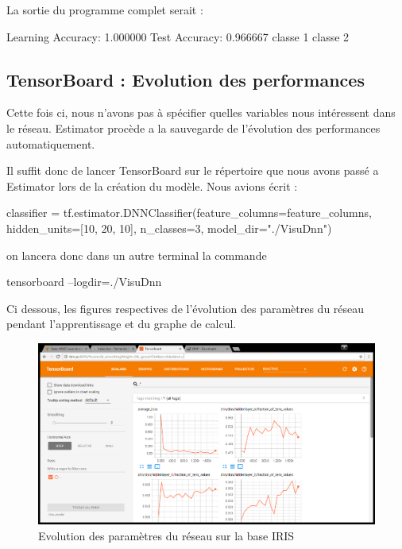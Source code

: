 \documentclass[a4paper,11pt]{book}
\begin{document}
La sortie du programme complet serait :
\begin{myoutput}
Learning Accuracy: 1.000000
Test Accuracy: 0.966667
classe  1
classe  2
\end{myoutput}

\subsection{TensorBoard : Evolution des performances}
Cette fois ci, nous n'avons pas à spécifier quelles variables nous intéressent dans le réseau. Estimator procède a la sauvegarde de l'évolution des performances automatiquement.

Il suffit donc de lancer TensorBoard sur le répertoire que nous avons passé a Estimator lors de la création du modèle.
Nous avions écrit :
\begin{mypython}
classifier = tf.estimator.DNNClassifier(feature_columns=feature_columns,
                                      hidden_units=[10, 20, 10],
                                      n_classes=3,
                                      model_dir="./VisuDnn")
\end{mypython}
on lancera donc dans un autre terminal la commande 
\begin{mybash}
tensorboard --logdir=./VisuDnn
\end{mybash}

Ci dessous, les figures respectives de l'évolution des paramètres du réseau pendant l'apprentissage et du graphe de calcul.
\begin{figure}[H]

\begin{center}
\includegraphics[width=16cm]{./figures/TensorBoardIrisDnn.png} 
\end{center}
\caption{Evolution des paramètres du réseau sur la base IRIS}
\end{figure}
\end{document}
